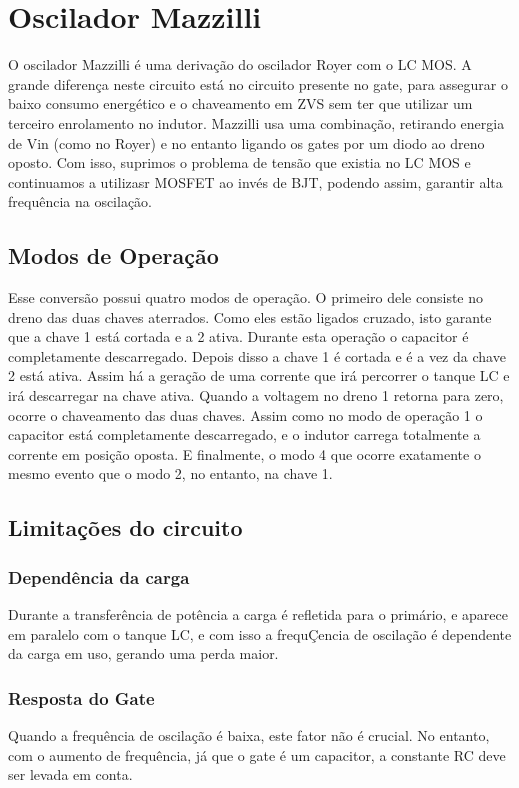 \section{Oscilador Mazzilli}
O oscilador Mazzilli é uma derivação do oscilador Royer com o LC MOS. A grande diferença neste circuito está no circuito presente no gate, para assegurar o baixo consumo energético e o chaveamento em ZVS sem ter que utilizar um terceiro enrolamento no indutor. Mazzilli usa uma combinação, retirando energia de Vin (como no Royer) e no entanto ligando os gates por um diodo ao dreno oposto. Com isso, suprimos o problema de tensão que existia no LC MOS e continuamos a utilizasr MOSFET ao invés de BJT, podendo assim, garantir alta frequência na oscilação.

\subsection{Modos de Operação}
Esse conversão possui quatro modos de operação. O primeiro dele consiste no dreno das duas chaves aterrados. Como eles estão ligados cruzado, isto garante que a chave 1 está cortada e a 2 ativa. Durante esta operação o capacitor é completamente descarregado. Depois disso a chave 1 é cortada e é a vez da chave 2 está ativa. Assim há a geração de uma corrente que irá percorrer o tanque LC e irá descarregar na chave ativa. Quando a voltagem no dreno 1 retorna para zero, ocorre o chaveamento das duas chaves. Assim como no modo de operação 1 o capacitor está completamente descarregado, e o indutor carrega totalmente a corrente em posição oposta. E finalmente, o modo 4 que ocorre exatamente o mesmo evento que o modo 2, no entanto, na chave 1.

\subsection{Limitações do circuito}

\subsubsection{Dependência da carga}
Durante a transferência de potência a carga é refletida para o primário, e aparece em paralelo com o tanque LC, e com isso a frequÇencia de oscilação é dependente da carga em uso, gerando uma perda maior.
\subsubsection{Resposta do Gate}
Quando a frequência de oscilação é baixa, este fator não é crucial. No entanto, com o aumento de frequência, já que o gate é um capacitor, a constante RC deve ser levada em conta.

